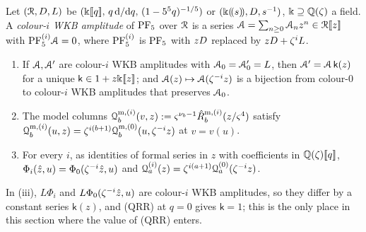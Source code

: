 \begin{lem}
\label{lem:gau-colrows}
Let $(\mathcal{R},D,L)$ be $(\Bbbk[\![ q ]\!],\,q\,\mathrm{d}/\mathrm{d} q,\,(1-5^5q)^{-1/5})$ or $(\Bbbk(\!(s)\!),D,s^{-1})$, $\Bbbk\supseteq\mathbb{Q}(\zeta)$ a field. A \emph{colour-$i$ WKB amplitude} of $\mathrm{PF}_{5}$ over $\mathcal{R}$ is a series $\mathcal{A}=\sum_{n\geq0}\mathcal{A}_nz^n\in\mathcal{R}[\![ z ]\!]$ with $\mathrm{PF}_{5}^{(i)}\mathcal{A}=0$, where $\mathrm{PF}_{5}^{(i)}$ is $\mathrm{PF}_{5}$ with $zD$ replaced by $zD+\zeta^iL$.
\begin{enumerate}
\item If $\mathcal{A},\mathcal{A}'$ are colour-$i$ WKB amplitudes with $\mathcal{A}_0=\mathcal{A}'_0=L$, then $\mathcal{A}'=\mathcal{A}\,\mathsf k(z)$ for a unique $\mathsf k\in1+z\Bbbk[\![ z ]\!]$; and $\mathcal{A}(z)\mapsto\mathcal{A}(\zeta^{-i}z)$ is a bijection from colour-$0$ to colour-$i$ WKB amplitudes that preserves $\mathcal{A}_0$.
\item The model columns $\mathcal{Q}^{\mathrm m,(i)}_b(v,z):=\varsigma^{\nu_b-1}\hat{R}^{\mathrm m,(i)}_b(z/\varsigma^4)$ satisfy $\mathcal{Q}^{\mathrm m,(i)}_b(u,z)=\zeta^{i(b+1)}\mathcal{Q}^{\mathrm m,(0)}_b(u,\zeta^{-i}z)$ at $v=v(u)$.
\item For every $i$, as identities of formal series in $z$ with coefficients in $\mathbb{Q}(\zeta)[\![ q ]\!]$, $\Phi_i(\hat{z},u)=\Phi_0(\zeta^{-i}\hat{z},u)$ and $\mathcal{Q}^{(i)}_a(z)=\zeta^{i(a+1)}\mathcal{Q}^{(0)}_a(\zeta^{-i}z)$.
\end{enumerate}
\end{lem}

In (iii), $L\Phi_i$ and $L\Phi_0(\zeta^{-i}\hat{z},u)$ are colour-$i$ WKB amplitudes, so they differ by a constant series $\mathsf k(z)$, and (QRR) at $q=0$ gives $\mathsf k=1$; this is the only place in this section where the value of (QRR) enters.

